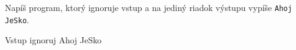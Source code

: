 




Napíš program, ktorý ignoruje vstup a na jediný riadok výstupu vypíše \texttt{Ahoj JeSko}.

\vstup
Vstup ignoruj
\vystup
Ahoj JeSko
\koniec


